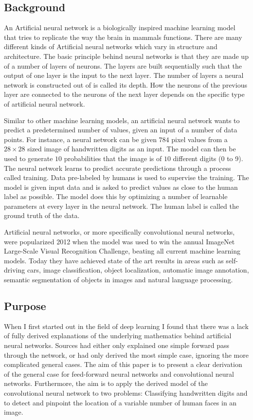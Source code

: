 \documentclass[a4paper, twoside]{article}
\begin{document}
\subsection{Background}

An Artificial neural network is a biologically inspired machine learning model that tries to replicate the way the brain in mammals functions. There are many different kinds of Artificial neural networks which vary in structure and architecture. The basic principle behind neural networks is that they are made up of a number of layers of neurons. The layers are built sequentially such that the output of one layer is the input to the next layer. The number of layers a neural network is constructed out of is called its depth. How the neurons of the previous layer are connected to the neurons of the next layer depends on the specific type of artificial neural network. \cite{cs231n}

Similar to other machine learning models, an artificial neural network wants to predict a predetermined number of values, given an input of a number of data points. For instance, a neural network can be given $784$ pixel values from a $28 \times 28$ sized image of handwritten digits as an input. The model can then be used to generate $10$ probabilities that the image is of $10$ different digits (0 to 9). The neural network learns to predict accurate predictions through a process called training. Data pre-labeled by humans is used to supervise the training. The model is given input data and is asked to predict values as close to the human label as possible. The model does this by optimizing a number of learnable parameters at every layer in the neural network. The human label is called the ground truth of the data. \cite{cs231n}

Artificial neural networks, or more specifically convolutional neural networks, were popularized 2012 when the model was used to win the annual ImageNet Large-Scale Visual Recognition Challenge, beating all current machine learning models. Today they have achieved state of the art results in areas such as self-driving cars, image classification, object localization, automatic image annotation, semantic segmentation of objects in images and natural language processing. \cite{cs231n}

\subsection{Purpose}
When I first started out in the field of deep learning I found that there was a lack of fully derived explanations of the underlying mathematics behind artificial neural networks. Sources had either only explained one simple forward pass through the network, or had only derived the most simple case, ignoring the more complicated general cases. The aim of this paper is to present a clear derivation of the general case for feed-forward neural networks and convolutional neural networks. Furthermore, the aim is to apply the derived model of the convolutional neural network to two problems: Classifying handwritten digits and to detect and pinpoint the location of a variable number of human faces in an image.
\end{document}
